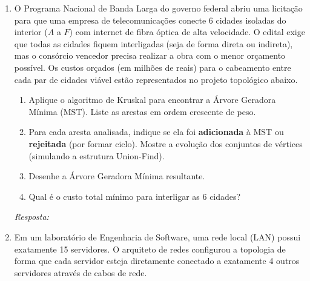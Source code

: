\documentclass[12pt,a4paper]{article}
\newcommand{\quadro}[1]{\vspace{0.2cm}\begin{tcolorbox}[colback=white, colframe=black, height=#1, boxrule=0.5pt, arc=0pt] \textit{Resposta:} \end{tcolorbox}}
\begin{document}
\begin{enumerate}
\item O Programa Nacional de Banda Larga do governo federal abriu uma licitação para que uma empresa de telecomunicações conecte 6 cidades isoladas do interior ($A$ a $F$) com internet de fibra óptica de alta velocidade. O edital exige que todas as cidades fiquem interligadas (seja de forma direta ou indireta), mas o consórcio vencedor precisa realizar a obra com o menor orçamento possível. Os custos orçados (em milhões de reais) para o cabeamento entre cada par de cidades viável estão representados no projeto topológico abaixo.

\begin{center}
\end{center}

\begin{enumerate}[label=\alph*)]
    \item Aplique o algoritmo de Kruskal para encontrar a Árvore Geradora Mínima (MST). Liste as arestas em ordem crescente de peso.
    \item Para cada aresta analisada, indique se ela foi \textbf{adicionada} à MST ou \textbf{rejeitada} (por formar ciclo). Mostre a evolução dos conjuntos de vértices (simulando a estrutura Union-Find).
    \item Desenhe a Árvore Geradora Mínima resultante.
    \item Qual é o custo total mínimo para interligar as 6 cidades?
\end{enumerate}
\quadro{12cm} 


\item Em um laboratório de Engenharia de Software, uma rede local (LAN) possui exatamente 15 servidores. O arquiteto de redes configurou a topologia de forma que cada servidor esteja diretamente conectado a exatamente 4 outros servidores através de cabos de rede. 


\end{enumerate}
\end{document}
